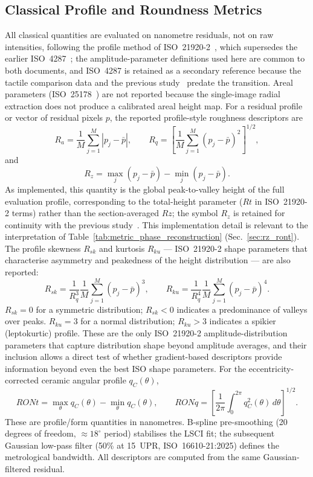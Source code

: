 \documentclass[review]{elsarticle}
\begin{document}
\subsection{Classical Profile and Roundness Metrics}
All classical quantities are evaluated on nanometre residuals, not on raw intensities, following the profile method of ISO~21920-2~\cite{ISO21920-2}, which supersedes the earlier ISO~4287~\cite{ISO4287}; the amplitude-parameter definitions used here are common to both documents, and ISO~4287 is retained as a secondary reference because the tactile comparison data and the previous study~\cite{kucharski2025radial-0ca} predate the transition. Areal parameters (ISO~25178~\cite{ISO25178}) are not reported because the single-image radial extraction does not produce a calibrated areal height map. For a residual profile or vector of residual pixels $p$, the reported profile-style roughness descriptors are
\begin{equation}
R_a=\frac{1}{M}\sum_{j=1}^{M}|p_j-\bar{p}|, \qquad
R_q=\left[\frac{1}{M}\sum_{j=1}^{M}(p_j-\bar{p})^2\right]^{1/2},
\end{equation}
and
\begin{equation}
R_z=\max_j(p_j-\bar{p})-\min_j(p_j-\bar{p}).
\end{equation}
As implemented, this quantity is the global peak-to-valley height of the full evaluation profile, corresponding to the total-height parameter ($Rt$ in ISO~21920-2 terms) rather than the section-averaged $Rz$; the symbol $R_z$ is retained for continuity with the previous study~\cite{kucharski2025radial-0ca}. This implementation detail is relevant to the interpretation of Table~\ref{tab:metric_phase_reconstruction} (Sec.~\ref{sec:rz_ront}).
The profile skewness $R_{sk}$ and kurtosis $R_{ku}$ — ISO~21920-2 shape parameters that characterise asymmetry and peakedness of the height distribution — are also reported:
\begin{equation}
R_{sk}=\frac{1}{R_q^3}\frac{1}{M}\sum_{j=1}^{M}(p_j-\bar{p})^3, \qquad
R_{ku}=\frac{1}{R_q^4}\frac{1}{M}\sum_{j=1}^{M}(p_j-\bar{p})^4.
\end{equation}
$R_{sk}=0$ for a symmetric distribution; $R_{sk}<0$ indicates a predominance of valleys over peaks. $R_{ku}=3$ for a normal distribution; $R_{ku}>3$ indicates a spikier (leptokurtic) profile. These are the only ISO~21920-2 amplitude-distribution parameters that capture distribution shape beyond amplitude averages, and their inclusion allows a direct test of whether gradient-based descriptors provide information beyond even the best ISO shape parameters.
For the eccentricity-corrected ceramic angular profile $q_C(\theta)$,
\begin{equation}
RONt=\max_{\theta}q_C(\theta)-\min_{\theta}q_C(\theta), \qquad
RONq=\left[\frac{1}{2\pi}\int_0^{2\pi}q_C^2(\theta)\,d\theta\right]^{1/2}.
\end{equation}
These are profile/form quantities in nanometres. B-spline pre-smoothing (20 degrees of freedom, $\approx 18^\circ$ period) stabilises the LSCI fit; the subsequent Gaussian low-pass filter (50\% at 15~UPR, ISO~16610-21:2025) defines the metrological bandwidth. All descriptors are computed from the same Gaussian-filtered residual.
\end{document}
